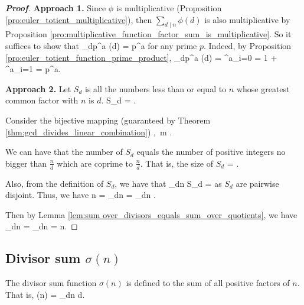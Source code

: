 \begin{proof}[\bf Proof]
{\bf Approach 1.} Since $\phi$ is multiplicative (Proposition \ref{pro:euler_totient_multiplicative}), then $\sum_{d\mid n} \phi(d)$ is also multiplicative by Proposition \ref{pro:multiplicative_function_factor_sum_is_multiplicative}. So it suffices to show that
\be
\sum_{d\mid p^a} \phi(d) = p^a
\ee
for any prime $p$. Indeed, by Proposition \ref{pro:euler_totient_function_prime_product},
\be
\sum_{d\mid p^a} \phi(d) = \sum^a_{i=0} \phi{} = 1 + \sum^a_{i=1}  = p^a.
\ee

{\bf Approach 2.} Let $S_d$ is all the numbers less than or equal to $n$ whose greatest common factor with $n$ is $d$.
\be
S_d = .
\ee%

Consider the bijective mapping (guaranteed by Theorem \ref{thm:gcd_divides_linear_combination})
\be
{} \to {},\ m \mapsto {}.
\ee


We can have that the number of $S_d$ equals the number of positive integers no bigger than $\frac nd$ which are coprime to $\frac nd$. That is, the size of $S_d$
\be
{} = \phi{}.
\ee

Also, from the definition of $S_d$, we have that
\be
\bigcup_{d\mid n} S_d = 
\ee
as $S_d$ are pairwise disjoint. Thus, we have
\be
n = \sum_{d\mid n}  = \sum_{d\mid n} \phi{}.
\ee

Then by Lemma \ref{lem:sum over_divisors_equals_sum_over_quotients}, we have
\be
\sum_{d\mid n} \phi{} = \sum_{d\mid n} \phi{} = n.
\ee
\end{proof}

\subsection{Divisor sum $\sigma(n)$}

\begin{definition}
The divisor sum function $\sigma(n)$ is defined to the sum of all positive factors of $n$. That is,
\be
\sigma(n) = \sum_{d\mid n} d.
\ee
\end{definition}

